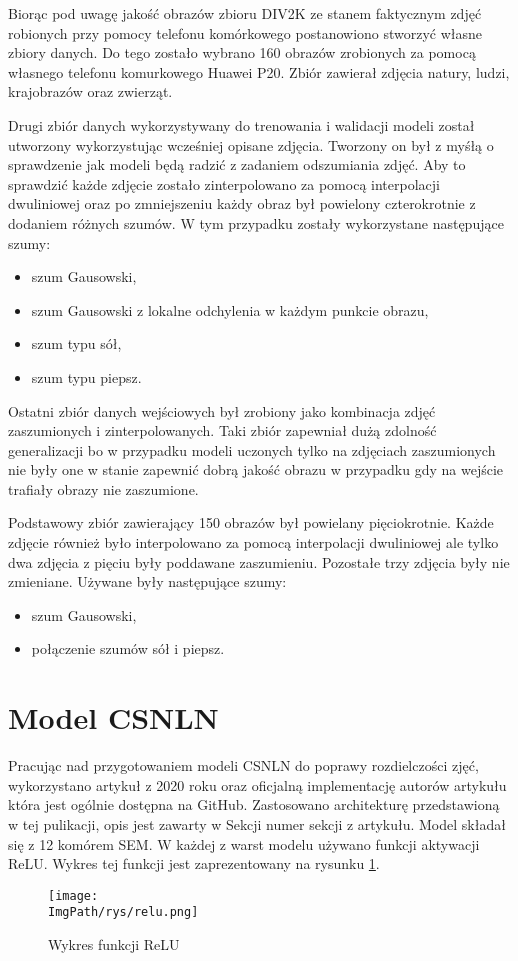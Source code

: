 \documentclass[a4paper,12pt,twoside,openany]{report}
\newcommand{\ImgPath}{.}
\begin{document}
Biorąc pod uwagę jakość obrazów zbioru DIV2K ze stanem faktycznym zdjęć robionych przy pomocy telefonu komórkowego postanowiono stworzyć własne zbiory danych. Do tego zostało wybrano 160 obrazów zrobionych za pomocą własnego telefonu komurkowego Huawei P20. Zbiór zawierał zdjęcia natury, ludzi, krajobrazów oraz zwierząt.

Drugi zbiór danych wykorzystywany do trenowania i walidacji modeli został utworzony wykorzystując wcześniej opisane zdjęcia. Tworzony on był z myśłą o sprawdzenie jak modeli będą radzić z zadaniem odszumiania zdjęć. Aby to sprawdzić każde zdjęcie zostało zinterpolowano za pomocą interpolacji dwuliniowej oraz po zmniejszeniu każdy obraz był powielony czterokrotnie z dodaniem różnych szumów. W tym przypadku zostały wykorzystane następujące szumy:
\begin{itemize}
	\item szum Gausowski,
	\item szum Gausowski z lokalne odchylenia w każdym punkcie obrazu,
	\item szum typu sół,
	\item szum typu piepsz.
\end{itemize} 

Ostatni zbiór danych wejściowych był zrobiony jako kombinacja zdjęć zaszumionych i  zinterpolowanych. Taki zbiór zapewniał dużą zdolność generalizacji bo w przypadku modeli uczonych tylko na zdjęciach zaszumionych nie były one w stanie zapewnić dobrą jakość obrazu w przypadku gdy na wejście trafiały obrazy nie zaszumione. 

Podstawowy zbiór zawierający 150 obrazów był powielany pięciokrotnie. Każde zdjęcie również było interpolowano za pomocą interpolacji dwuliniowej ale tylko dwa zdjęcia z pięciu były  poddawane zaszumieniu. Pozostałe trzy zdjęcia były nie zmieniane. Używane były następujące szumy:
\begin{itemize}
 	\item szum Gausowski,
 	\item połączenie szumów sół i piepsz.
\end{itemize} 

\section{Model CSNLN}
Pracując nad przygotowaniem modeli CSNLN do poprawy rozdielczości zjęć, wykorzystano artykuł z 2020 roku oraz oficjalną implementację autorów artykułu która jest ogólnie dostępna na GitHub. Zastosowano architekturę przedstawioną w tej pulikacji, opis jest zawarty w Sekcji numer sekcji z artykułu. Model składał się z 12 komórem SEM. W każdej  z warst modelu używano funkcji aktywacji ReLU. Wykres tej funkcji jest zaprezentowany na rysunku \ref{relu}.
\begin{figure}[!htbp]
	\begin{center}
		\centering
		\texttt{[image: \\ImgPath/rys/relu.png]}
	\end{center}
	\caption{Wykres funkcji ReLU}
	\label{relu}
\end{figure}    
\end{document}
